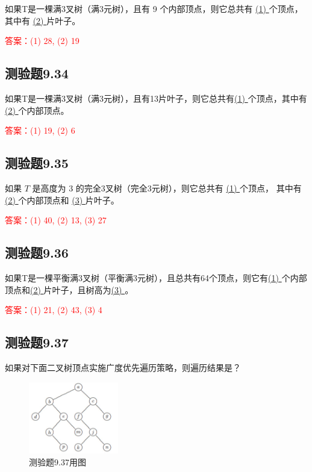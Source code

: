 \documentclass[UTF8, heading=true]{ctexart}
\begin{document}
如果T是一棵满3叉树（满3元树），且有 9 个内部顶点，则它总共有
\underline{\quad (1) \quad}个顶点，其中有 \underline{\quad (2) \quad}片叶子。

\textcolor{red}{答案：(1) 28, (2) 19}

\subsection{测验题9.34}

如果T是一棵满3叉树（满3元树），且有13片叶子，则它总共有\underline{\quad (1) \quad}个顶点，其中有\underline{\quad (2) \quad}个内部顶点。

\textcolor{red}{答案：(1) 19, (2) 6}

\subsection{测验题9.35}

如果 $T$ 是高度为 3 的完全3叉树（完全3元树），则它总共有 \underline{\quad (1) \quad}个顶点，
其中有 \underline{\quad (2) \quad}个内部顶点和 \underline{\quad (3) \quad}片叶子。

\textcolor{red}{答案：(1) 40, (2) 13, (3) 27}

\subsection{测验题9.36}

如果T是一棵平衡满3叉树（平衡满3元树），且总共有64个顶点，则它有\underline{\quad (1) \quad}个内部顶点和\underline{\quad (2) \quad}片叶子，且树高为\underline{\quad (3) \quad}。

\textcolor{red}{答案：(1) 21, (2) 43, (3) 4}

\subsection{测验题9.37}

如果对下面二叉树顶点实施广度优先遍历策略，则遍历结果是？

\begin{figure}[H]
  \centering
  \includegraphics[width=0.35\textwidth]{9.37.jpg} %
  \caption{测验题9.37用图}
\end{figure}
\end{document}
